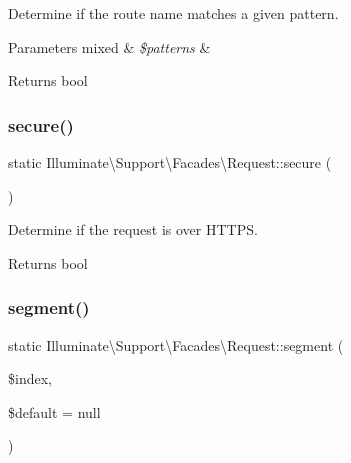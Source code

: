 Determine if the route name matches a given pattern.


\begin{DoxyParams}[1]{Parameters}
mixed & {\em \$patterns} & \\
\hline
\end{DoxyParams}
\begin{DoxyReturn}{Returns}
bool 
\end{DoxyReturn}
\mbox{\label{class_illuminate_1_1_support_1_1_facades_1_1_request_a80f6609d3acb22116e64c05d6e0ecfb9}} 
\subsubsection{\texorpdfstring{secure()}{secure()}}
{\footnotesize\ttfamily static Illuminate\textbackslash{}\+Support\textbackslash{}\+Facades\textbackslash{}\+Request\+::secure (\begin{DoxyParamCaption}{ }\end{DoxyParamCaption})\hspace{0.3cm}{\ttfamily [static]}}

Determine if the request is over H\+T\+T\+PS.

\begin{DoxyReturn}{Returns}
bool 
\end{DoxyReturn}
\mbox{\label{class_illuminate_1_1_support_1_1_facades_1_1_request_a860203430647b4261b5ecbdd04242dd0}} 
\subsubsection{\texorpdfstring{segment()}{segment()}}
{\footnotesize\ttfamily static Illuminate\textbackslash{}\+Support\textbackslash{}\+Facades\textbackslash{}\+Request\+::segment (\begin{DoxyParamCaption}\item[{}]{\$index,  }\item[{}]{\$default = {\ttfamily null} }\end{DoxyParamCaption})\hspace{0.3cm}{\ttfamily [static]}}

